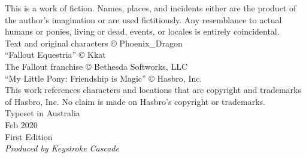 \clearpage
\thispagestyle{empty}
\null\vspace{2\baselineskip}
\begin{adjustwidth}{4em}{4em}
\begin{center}
\begin{parascale}[0.9]
\noindent
This is a work of fiction. Names, places, and incidents either are the product of the author’s imagination or are used fictitiously. Any resemblance to actual humans or ponies, living or dead, events, or locales is entirely coincidental.\\
\vspace{\baselineskip}
\noindent
Text and original characters © Phoenix\_Dragon\\
“Fallout Equestria” © Kkat\\
The Fallout franchise © Bethesda Softworks, LLC\\
“My Little Pony: Friendship is Magic” © Hasbro, Inc.\\
\vspace{\baselineskip}
\noindent
This work references characters and locations that are copyright and trademarks of Hasbro, Inc. No claim is made on Hasbro’s copyright or trademarks.\\
\vspace{13\baselineskip}
\noindent
Typeset in Australia\\
Feb 2020\\
First Edition\\
\vspace{\baselineskip}
\noindent
\textit{Produced by Keystroke Cascade}
\end{parascale}
\end{center}
\end{adjustwidth}

